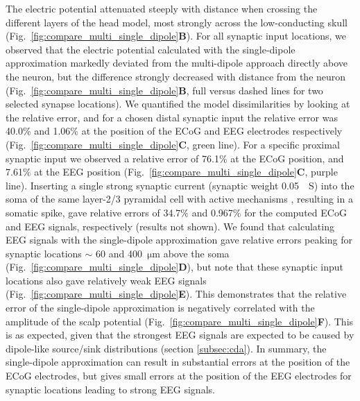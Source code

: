 \documentclass[preprint,10pt,authoryear]{elsarticle}
\newcommand{\hlp}[2][Purple]{ {\sethlcolor{#1} \hl{#2}} }
\newcommand{\gen}[1]{\color{white}{\hlp{GTE: #1 }}\color{black}}
\begin{document}
The electric potential attenuated steeply with distance when crossing the different layers of the head model, most strongly across the low-conducting skull (Fig.~\ref{fig:compare_multi_single_dipole}\textbf{B}). 
For all synaptic input locations, we observed that the electric potential calculated with the single-dipole approximation markedly deviated from the multi-dipole approach directly above the neuron, but the difference strongly decreased with distance from the neuron 
(Fig.~\ref{fig:compare_multi_single_dipole}\textbf{B}, full versus dashed lines for two selected synapse locations). 
We quantified the model dissimilarities by looking at the relative error, and for a chosen distal synaptic input the relative error was 40.0\% and 1.06\% at the position of the ECoG and EEG electrodes respectively (Fig.~\ref{fig:compare_multi_single_dipole}\textbf{C}, green line). For a specific proximal synaptic input we observed a relative error of 76.1$\%$ at the ECoG position, and 7.61$\%$ at the EEG position (Fig.~\ref{fig:compare_multi_single_dipole}\textbf{C}, purple line). Inserting a single strong synaptic current (synaptic weight 0.05~\si{\mu S}) into the soma of the same layer-2/3 pyramidal cell with active mechanisms \citep{EYAL2018}, resulting in a somatic spike, gave relative errors of 34.7$\%$ and 0.967$\%$ for the computed ECoG and EEG signals, respectively (results not shown).
We found that calculating EEG signals with the single-dipole approximation gave relative errors peaking for synaptic locations $\sim$ 60 and 400~$\si{\um}$ above the soma (Fig.~\ref{fig:compare_multi_single_dipole}\textbf{D}),
but note that these synaptic input locations also gave relatively weak EEG signals (Fig.~\ref{fig:compare_multi_single_dipole}\textbf{E}).
This demonstrates that the relative error of the single-dipole approximation is negatively correlated with the amplitude of the scalp potential (Fig.~\ref{fig:compare_multi_single_dipole}\textbf{F}).
This is as expected, given that the strongest EEG signals are expected to be caused by dipole-like source/sink distributions (section \ref{subsec:cda}).
In summary, the single-dipole approximation can result in substantial errors at the position of the ECoG electrodes, but gives small errors at the position of the EEG electrodes for synaptic locations leading to strong EEG signals.
\end{document}
